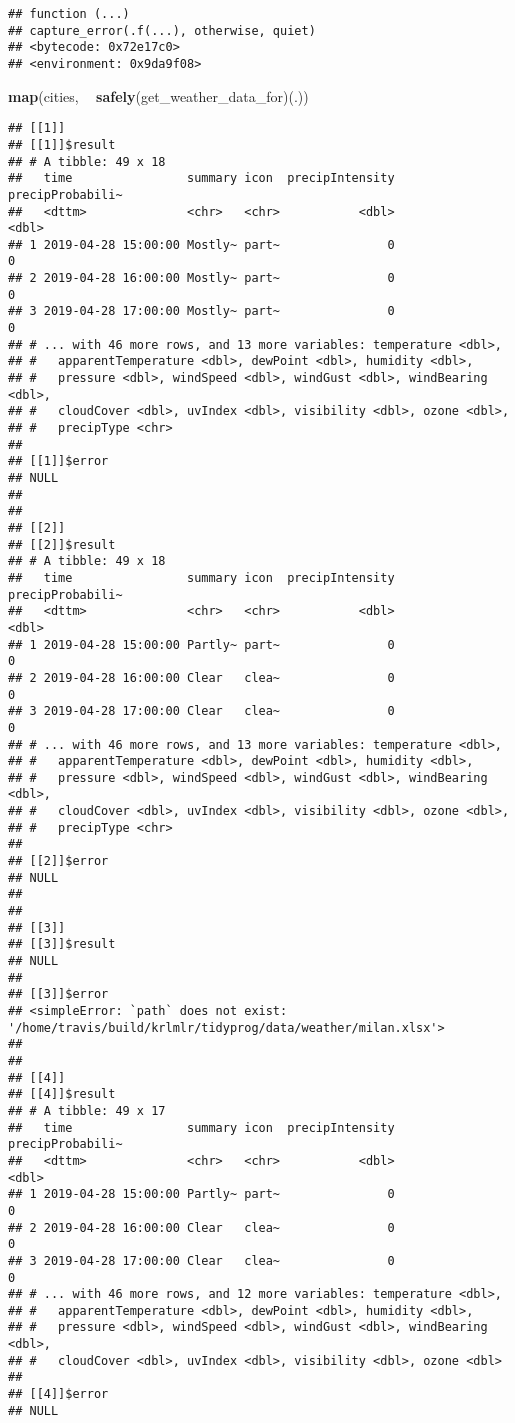\documentclass[]{book}
\newenvironment{Shaded}{\begin{snugshade}}{\end{snugshade}}
\newcommand{\KeywordTok}[1]{\textcolor[rgb]{0.13,0.29,0.53}{\textbf{#1}}}
\newcommand{\NormalTok}[1]{#1}
\newcommand{\OperatorTok}[1]{\textcolor[rgb]{0.81,0.36,0.00}{\textbf{#1}}}
\newcommand{\StringTok}[1]{\textcolor[rgb]{0.31,0.60,0.02}{#1}}
\begin{document}
\begin{verbatim}
## function (...) 
## capture_error(.f(...), otherwise, quiet)
## <bytecode: 0x72e17c0>
## <environment: 0x9da9f08>
\end{verbatim}

\begin{Shaded}
\begin{Highlighting}[]
\KeywordTok{map}\NormalTok{(cities, }\OperatorTok{~}\StringTok{ }\KeywordTok{safely}\NormalTok{(get_weather_data_for)(.))}
\end{Highlighting}
\end{Shaded}

\begin{verbatim}
## [[1]]
## [[1]]$result
## # A tibble: 49 x 18
##   time                summary icon  precipIntensity precipProbabili~
##   <dttm>              <chr>   <chr>           <dbl>            <dbl>
## 1 2019-04-28 15:00:00 Mostly~ part~               0                0
## 2 2019-04-28 16:00:00 Mostly~ part~               0                0
## 3 2019-04-28 17:00:00 Mostly~ part~               0                0
## # ... with 46 more rows, and 13 more variables: temperature <dbl>,
## #   apparentTemperature <dbl>, dewPoint <dbl>, humidity <dbl>,
## #   pressure <dbl>, windSpeed <dbl>, windGust <dbl>, windBearing <dbl>,
## #   cloudCover <dbl>, uvIndex <dbl>, visibility <dbl>, ozone <dbl>,
## #   precipType <chr>
## 
## [[1]]$error
## NULL
## 
## 
## [[2]]
## [[2]]$result
## # A tibble: 49 x 18
##   time                summary icon  precipIntensity precipProbabili~
##   <dttm>              <chr>   <chr>           <dbl>            <dbl>
## 1 2019-04-28 15:00:00 Partly~ part~               0                0
## 2 2019-04-28 16:00:00 Clear   clea~               0                0
## 3 2019-04-28 17:00:00 Clear   clea~               0                0
## # ... with 46 more rows, and 13 more variables: temperature <dbl>,
## #   apparentTemperature <dbl>, dewPoint <dbl>, humidity <dbl>,
## #   pressure <dbl>, windSpeed <dbl>, windGust <dbl>, windBearing <dbl>,
## #   cloudCover <dbl>, uvIndex <dbl>, visibility <dbl>, ozone <dbl>,
## #   precipType <chr>
## 
## [[2]]$error
## NULL
## 
## 
## [[3]]
## [[3]]$result
## NULL
## 
## [[3]]$error
## <simpleError: `path` does not exist: '/home/travis/build/krlmlr/tidyprog/data/weather/milan.xlsx'>
## 
## 
## [[4]]
## [[4]]$result
## # A tibble: 49 x 17
##   time                summary icon  precipIntensity precipProbabili~
##   <dttm>              <chr>   <chr>           <dbl>            <dbl>
## 1 2019-04-28 15:00:00 Partly~ part~               0                0
## 2 2019-04-28 16:00:00 Clear   clea~               0                0
## 3 2019-04-28 17:00:00 Clear   clea~               0                0
## # ... with 46 more rows, and 12 more variables: temperature <dbl>,
## #   apparentTemperature <dbl>, dewPoint <dbl>, humidity <dbl>,
## #   pressure <dbl>, windSpeed <dbl>, windGust <dbl>, windBearing <dbl>,
## #   cloudCover <dbl>, uvIndex <dbl>, visibility <dbl>, ozone <dbl>
## 
## [[4]]$error
## NULL
\end{verbatim}
\end{document}
